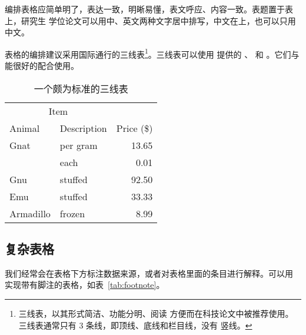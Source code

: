 编排表格应简单明了，表达一致，明晰易懂，表文呼应、内容一致。表题置于表上，研究生
学位论文可以用中、英文两种文字居中排写，中文在上，也可以只用中文。

表格的编排建议采用国际通行的三线表\footnote{三线表，以其形式简洁、功能分明、阅读
方便而在科技论文中被推荐使用。三线表通常只有 3 条线，即顶线、底线和栏目线，没有
竖线。}。三线表可以使用  提供的 、 和
。它们与  能很好的配合使用。

\begin{table}[!hpt]
  \caption[一个颇为标准的三线表]{一个颇为标准的三线表\footnotemark}
  \label{tab:firstone}
  \centering
  \begin{tabular}{@{}llr@{}} \toprule
    \multicolumn{2}{c}{Item} \\ \cmidrule(r){1-2}
    Animal & Description & Price (\$)\\ \midrule
    Gnat  & per gram  & 13.65 \\
          & each      & 0.01 \\
    Gnu   & stuffed   & 92.50 \\
    Emu   & stuffed   & 33.33 \\
    Armadillo & frozen & 8.99 \\ \bottomrule
  \end{tabular}
\end{table}

\subsection{复杂表格}

我们经常会在表格下方标注数据来源，或者对表格里面的条目进行解释。可以用
 实现带有脚注的表格，如表~\ref{tab:footnote}。

